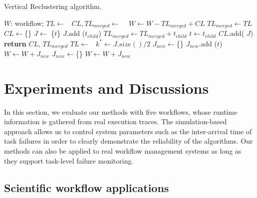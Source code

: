 \documentclass{IOS-Book-Article}
\begin{document}
\begin{algorithm}[!htb]
	\footnotesize
	\caption{Vertical Reclustering algorithm.}
	\label{alg:evaluation_vr}
	\begin{algorithmic}[1]
		\Require $W$: workflow; 
				\State $TL\gets $\  
				\State $CL, TL_{merged}\gets$  \  
				\State $W \gets W - TL_{merged} + CL$   
			\EndFor
		\EndProcedure
			\State $TL_{merged}\gets TL$
			\State $CL\gets$\{\}
				\State $J\gets$ \{$t$\}
					\State $J$.add ($t_{child}$)
					\State $TL_{merged}\gets TL_{merged} + t_{child}$ 
					\State $t\gets t_{child}$
				\EndWhile
				\State  $CL$.add( $J$)
			\EndFor
			\State \textbf{return} $CL$, $TL_{merged}$
		\EndProcedure
			\State $TL \gets$\ 
			\State $k^*\gets J.size() / 2$ 
			\State $J_{new}\gets$\{\}
					\State $J_{new}$.add ($t$)
				\EndIf
					\State $W \gets W + J_{new}$
					\State $J_{new}\gets$\{\}
				\EndIf
			\EndFor
			\State $W \gets W + J_{new}$ 
		\EndProcedure
	\end{algorithmic}
\end{algorithm}



\section{Experiments and Discussions}
\label{sec:experiments}


In this section, we evaluate our methods with five workflows, whose runtime information is gathered from real execution traces. The simulation-based approach allows us to control system parameters such as the inter-arrival time of task failures in order to clearly demonstrate the reliability of the algorithms. Our methods can also be applied to real workflow management systems as long as they support task-level failure monitoring. 

\subsection{Scientific workflow applications}
\label{sec:applications}
\end{document}

